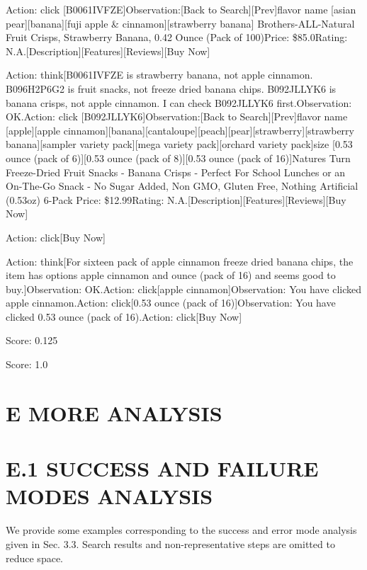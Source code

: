 \documentclass[
]{article}
\begin{document}
Action: click {[}B0061IVFZE{]}Observation:{[}Back to
Search{]}{[}Prev{]}flavor name {[}asian pear{]}{[}banana{]}{[}fuji apple
\& cinnamon{]}{[}strawberry banana{]} Brothers-ALL-Natural Fruit Crisps,
Strawberry Banana, 0.42 Ounce (Pack of 100)Price: \$85.0Rating:
N.A.{[}Description{]}{[}Features{]}{[}Reviews{]}{[}Buy Now{]}

Action: think{[}B0061IVFZE is strawberry banana, not apple cinnamon.
B096H2P6G2 is fruit snacks, not freeze dried banana chips. B092JLLYK6 is
banana crisps, not apple cinnamon. I can check B092JLLYK6
first.Observation: OK.Action: click {[}B092JLLYK6{]}Observation:{[}Back
to Search{]}{[}Prev{]}flavor name {[}apple{]}{[}apple
cinnamon{]}{[}banana{]}{[}cantaloupe{]}{[}peach{]}{[}pear{]}{[}strawberry{]}{[}strawberry
banana{]}{[}sampler variety pack{]}{[}mega variety pack{]}{[}orchard
variety pack{]}size {[}0.53 ounce (pack of 6){]}{[}0.53 ounce (pack of
8){]}{[}0.53 ounce (pack of 16){]}Nature\textquotesingle s Turn
Freeze-Dried Fruit Snacks - Banana Crisps - Perfect For School Lunches
or an On-The-Go Snack - No Sugar Added, Non GMO, Gluten Free, Nothing
Artificial (0.53oz) 6-Pack Price: \$12.99Rating:
N.A.{[}Description{]}{[}Features{]}{[}Reviews{]}{[}Buy Now{]}

Action: click{[}Buy Now{]}

Action: think{[}For sixteen pack of apple cinnamon freeze dried banana
chips, the item has options \textquotesingle apple
cinnamon\textquotesingle{} and  ounce (pack of
16)\textquotesingle{} and seems good to buy.{]}Observation: OK.Action:
click{[}apple cinnamon{]}Observation: You have clicked apple
cinnamon.Action: click{[}0.53 ounce (pack of 16){]}Observation: You have
clicked 0.53 ounce (pack of 16).Action: click{[}Buy Now{]}

Score: 0.125

Score: 1.0

\section{E MORE ANALYSIS}\label{e-more-analysis}

\section{E.1 SUCCESS AND FAILURE MODES
ANALYSIS}\label{e.1-success-and-failure-modes-analysis}

We provide some examples corresponding to the success and error mode
analysis given in Sec. 3.3. Search results and non-representative steps
are omitted to reduce space.
\end{document}
